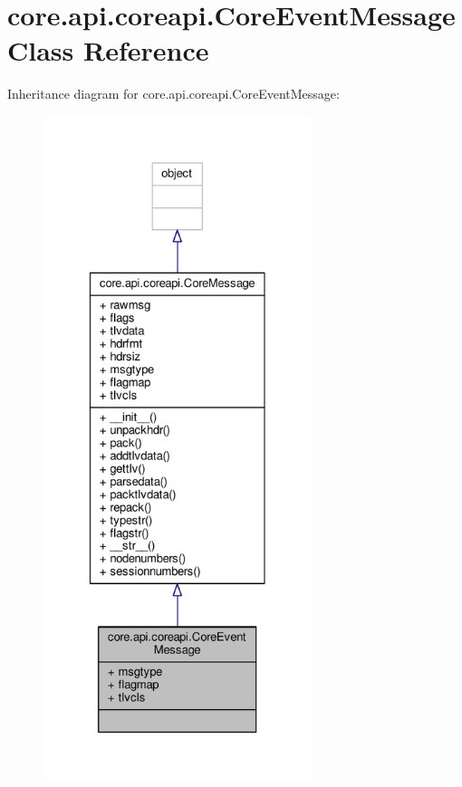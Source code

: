 \hypertarget{classcore_1_1api_1_1coreapi_1_1_core_event_message}{\section{core.\+api.\+coreapi.\+Core\+Event\+Message Class Reference}
\label{classcore_1_1api_1_1coreapi_1_1_core_event_message}
}


Inheritance diagram for core.\+api.\+coreapi.\+Core\+Event\+Message\+:
\nopagebreak
\begin{figure}[H]
\begin{center}
\leavevmode
\includegraphics[height=550pt]{classcore_1_1api_1_1coreapi_1_1_core_event_message__inherit__graph}
\end{center}
\end{figure}


